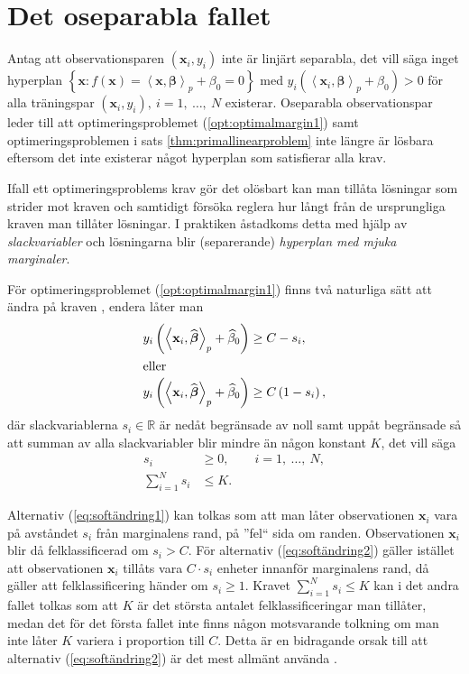\documentclass[a4paper, 12pt]{report}
\theoremstyle{definition}
\theoremstyle{remark}
\newcommand{\bfbeta}{{\boldsymbol{\beta}}}
\newcommand{\bfx}{\mathbf{x}}
\newcommand{\llangle}{\left\langle}
\newcommand{\rrangle}{\right\rangle}
\newcommand{\inner}[2]{\llangle #1, #2 \rrangle}
\begin{document}
\section{Det oseparabla fallet}
Antag att observationsparen $\left(\mathbf{x}_i, y_i\right)$ inte är linjärt separabla, det vill säga inget hyperplan $\left\{\mathbf{x} : f\left(\mathbf{x}\right) = \inner{\bfx}{\bfbeta}_p + \beta_0 = 0 \right\}$ med $y_i\left(\inner{\bfx_i}{\bfbeta}_p+\beta_0\right)>0$ för alla träningspar $\left(\mathbf{x}_i, y_i\right),~i=1,~\dots,~N$ existerar. Oseparabla observationspar leder till att optimeringsproblemet (\ref{opt:optimalmargin1}) samt optimeringsproblemen i sats \ref{thm:primallinearproblem} inte längre är lösbara eftersom det inte existerar något hyperplan som satisfierar alla krav.

Ifall ett optimeringsproblems krav gör det olösbart kan man tillåta lösningar som strider mot kraven och samtidigt försöka reglera hur långt från de ursprungliga kraven man tillåter lösningar. I praktiken åstadkoms detta med hjälp av \emph{slackvariabler} och lösningarna blir (separerande) \emph{hyperplan med mjuka marginaler}.

För optimeringsproblemet (\ref{opt:optimalmargin1}) finns två naturliga sätt att ändra på kraven \cite{ESL}, endera låter man
\begin{align}
	y_i\left(\inner{\bfx_i}{\widehat{\bfbeta}}_p+\widehat{\beta}_0\right) &\geq C-s_i,\label{eq:softändring1}\\
	\intertext{eller}
	y_i\left(\inner{\bfx_i}{\widehat{\bfbeta}}_p+\widehat{\beta}_0\right) &\geq C\left(1-s_i\right),\label{eq:softändring2}
\end{align}
där slackvariablerna $s_i\in\mathbb{R}$ är nedåt begränsade av noll samt uppåt begränsade så att summan av alla slackvariabler blir mindre än någon konstant $K$, det vill säga
\begin{equation*}
\begin{aligned}
s_i&\geq0,\qquad i=1,~\dots,~N,\\
\sum_{i=1}^{N}s_i&\leq K.
\end{aligned}
\end{equation*}

Alternativ (\ref{eq:softändring1}) kan tolkas som att man låter observationen $\mathbf{x}_i$ vara på avståndet $s_i$ från marginalens rand, på ''fel`` sida om randen. Observationen $\mathbf{x}_i$ blir då felklassificerad om $s_i>C$. För alternativ (\ref{eq:softändring2}) gäller istället att observationen $\mathbf{x}_i$ tillåts vara $C\cdot s_i$ enheter innanför marginalens rand, då gäller att felklassificering händer om $s_i\geq1$. Kravet $\sum_{i=1}^{N} s_i \leq K$ kan i det andra fallet tolkas som att $K$ är det största antalet felklassificeringar man tillåter, medan det för det första fallet inte finns någon motsvarande tolkning om man inte låter $K$ variera i proportion till $C$. Detta är en bidragande orsak till att alternativ (\ref{eq:softändring2}) är det mest allmänt använda \cite{ESL}.
\end{document}
